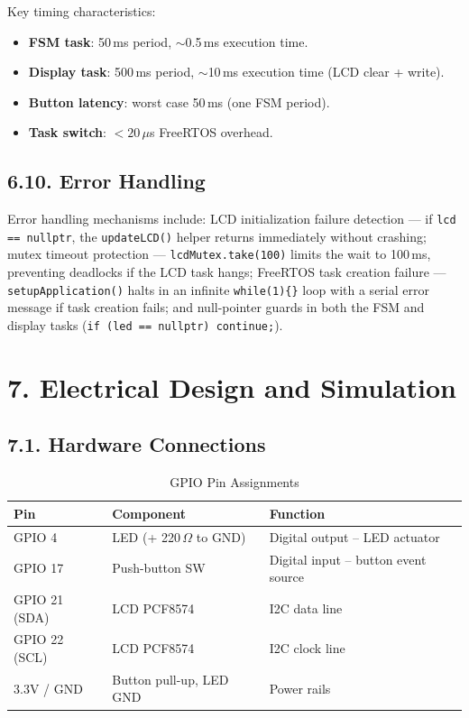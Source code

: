 \documentclass[12pt]{article}
\begin{document}
Key timing characteristics:
\begin{itemize}
    \item \textbf{FSM task}: 50\,ms period, $\sim$0.5\,ms execution time.
    \item \textbf{Display task}: 500\,ms period, $\sim$10\,ms execution time (LCD clear + write).
    \item \textbf{Button latency}: worst case 50\,ms (one FSM period).
    \item \textbf{Task switch}: $<20\,\mu$s FreeRTOS overhead.
\end{itemize}

\subsection*{6.10. Error Handling}

Error handling mechanisms include: LCD initialization failure detection — if \texttt{lcd == nullptr}, the \texttt{updateLCD()} helper returns immediately without crashing; mutex timeout protection — \texttt{lcdMutex.take(100)} limits the wait to 100\,ms, preventing deadlocks if the LCD task hangs; FreeRTOS task creation failure — \texttt{setupApplication()} halts in an infinite \texttt{while(1)\{\}} loop with a serial error message if task creation fails; and null-pointer guards in both the FSM and display tasks (\texttt{if (led == nullptr) continue;}).

\section*{7. Electrical Design and Simulation}

\subsection*{7.1. Hardware Connections}

\begin{table}[H]
    \centering
    \caption{GPIO Pin Assignments}
    \label{tab:pin-assignments}
    \begin{tabular}{|l|l|l|}
        \hline
        \textbf{Pin} & \textbf{Component} & \textbf{Function} \\
        \hline
        GPIO 4  & LED (+ 220\,$\Omega$ to GND) & Digital output – LED actuator \\
        \hline
        GPIO 17 & Push-button SW & Digital input – button event source \\
        \hline
        GPIO 21 (SDA) & LCD PCF8574 & I2C data line \\
        \hline
        GPIO 22 (SCL) & LCD PCF8574 & I2C clock line \\
        \hline
        3.3V / GND & Button pull-up, LED GND & Power rails \\
        \hline
    \end{tabular}
\end{table}
\end{document}
